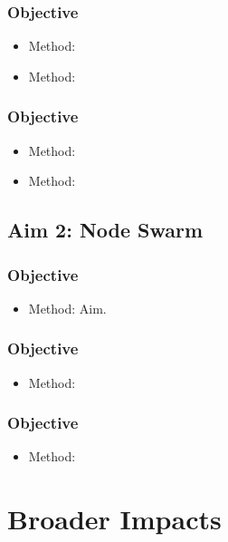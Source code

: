 \documentclass[12pt, oneside]{article}
\begin{document}
\subsubsection{Objective}

\begin{itemize}
 \item Method:
 \item Method:
\end{itemize}

\subsubsection{Objective}

\begin{itemize}
 \item Method:
 \item Method:
\end{itemize}

\subsection{Aim 2: Node Swarm}

\subsubsection{Objective}
\begin{itemize}
 \item Method:
 Aim.
\end{itemize}

\subsubsection{Objective}
\begin{itemize}
 \item Method:
\end{itemize}

\subsubsection{Objective}
\begin{itemize}
 \item Method:
\end{itemize}


\section{Broader Impacts}



\end{document}

